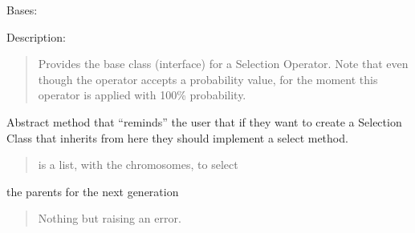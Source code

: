 \documentclass[letterpaper,10pt,english]{sphinxmanual}
\begin{document}
\begin{fulllineitems}
\label{\detokenize{pygenalgo.operators.selection:pygenalgo.operators.selection.select_operator.SelectionOperator}}
\pysigstartsignatures
{}
\pysigstopsignatures
\sphinxAtStartPar
Bases: {\hyperref[\detokenize{pygenalgo.operators:pygenalgo.operators.genetic_operator.GeneticOperator}]{}}

\sphinxAtStartPar
Description:
\begin{quote}

\sphinxAtStartPar
Provides the base class (interface) for a Selection Operator.  Note that even
though the operator accepts a probability value, for the moment this operator
is applied with 100\% probability.
\end{quote}

\begin{fulllineitems}
\label{\detokenize{pygenalgo.operators.selection:pygenalgo.operators.selection.select_operator.SelectionOperator.select}}
\pysigstartsignatures
{}
\pysigstopsignatures
\sphinxAtStartPar
Abstract method that “reminds” the user that if they want to
create a Selection Class that inherits from here they should
implement a select method.
\begin{quote}\begin{description}
\sphinxAtStartPar
{} \textendash{} is a list, with the chromosomes, to select

\end{description}\end{quote}

\sphinxAtStartPar
the parents for the next generation
\begin{quote}\begin{description}
\sphinxAtStartPar
Nothing but raising an error.

\end{description}\end{quote}

\end{fulllineitems}


\end{fulllineitems}
\end{document}

